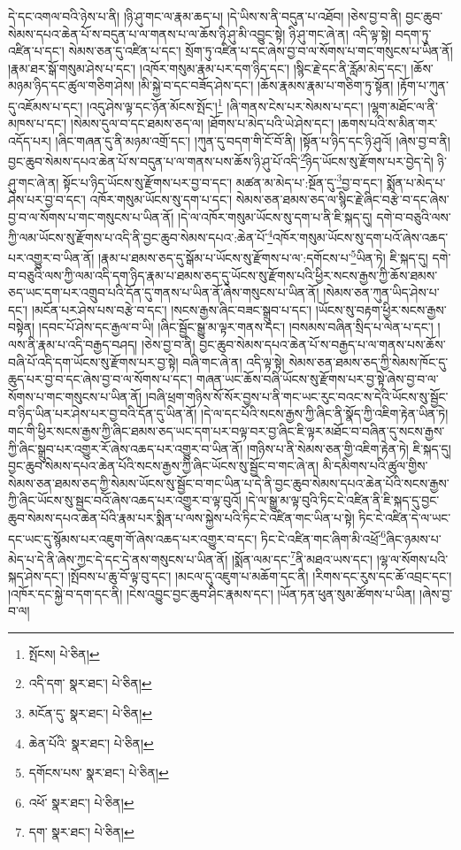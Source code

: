 དེ་དང་འགལ་བའི་ཉེས་པ་ནི། །ཉི་ཤུ་གང་ལ་རྣམ་ཆད་པ། །དེ་ཡིས་ས་ནི་བདུན་པ་འཐོབ། །ཅེས་བྱ་བ་ནི། བྱང་ཆུབ་སེམས་དཔའ་ཆེན་པོ་ས་བདུན་པ་ལ་གནས་པ་ལ་ཆོས་ཉི་ཤུ་མི་འབྱུང་སྟེ། ཉི་ཤུ་གང་ཞེ་ན། འདི་ལྟ་སྟེ། བདག་ཏུ་འཛིན་པ་དང་། སེམས་ཅན་དུ་འཛིན་པ་དང་། སྲོག་ཏུ་འཛིན་པ་དང་ཞེས་བྱ་བ་ལ་སོགས་པ་གང་གསུངས་པ་ཡིན་ནོ། །རྣམ་ཐར་སྒོ་གསུམ་ཤེས་པ་དང་། །འཁོར་གསུམ་རྣམ་པར་དག་ཉིད་དང་། །སྙིང་རྗེ་དང་ནི་རློམ་མེད་དང་། །ཆོས་མཉམ་ཉིད་དང་ཚུལ་གཅིག་ཤེས། །མི་སྐྱེ་བ་དང་བཟོད་ཤེས་དང་། །ཆོས་རྣམས་རྣམ་པ་གཅིག་ཏུ་སྟོན། །རྟོག་པ་ཀུན་དུ་འཇོམས་པ་དང་། །འདུ་ཤེས་ལྟ་དང་ཉོན་མོངས་སྤོང་།\footnote{སྤོངས།  པེ་ཅིན། } །ཞི་གནས་ངེས་པར་སེམས་པ་དང་། །ལྷག་མཐོང་ལ་ནི་མཁས་པ་དང་། །སེམས་དུལ་བ་དང་ཐམས་ཅད་ལ། །ཐོགས་པ་མེད་པའི་ཡེ་ཤེས་དང་། །ཆགས་པའི་ས་མིན་གར་འདོད་པར། །ཞིང་གཞན་དུ་ནི་མཉམ་འགྲོ་དང་། །ཀུན་དུ་བདག་གི་ངོ་བོ་ནི། །སྟོན་པ་ཉིད་དང་ཉི་ཤུའོ། །ཞེས་བྱ་བ་ནི། བྱང་ཆུབ་སེམས་དཔའ་ཆེན་པོ་ས་བདུན་པ་ལ་གནས་པས་ཆོས་ཉི་ཤུ་པོ་འདི་\footnote{འདི་དག་  སྣར་ཐང་།  པེ་ཅིན། }ཉིད་ཡོངས་སུ་རྫོགས་པར་བྱེད་དེ། ཉི་ཤུ་གང་ཞེ་ན། སྟོང་པ་ཉིད་ཡོངས་སུ་རྫོགས་པར་བྱ་བ་དང་། མཚན་མ་མེད་པ་:སྔོན་དུ་\footnote{མངོན་དུ་  སྣར་ཐང་།  པེ་ཅིན། }བྱ་བ་དང་། སྨོན་པ་མེད་པ་ཤེས་པར་བྱ་བ་དང་། འཁོར་གསུམ་ཡོངས་སུ་དག་པ་དང་། སེམས་ཅན་ཐམས་ཅད་ལ་སྙིང་རྗེ་ཞིང་བརྩེ་བ་དང་ཞེས་བྱ་བ་ལ་སོགས་པ་གང་གསུངས་པ་ཡིན་ནོ། །དེ་ལ་འཁོར་གསུམ་ཡོངས་སུ་དག་པ་ནི་ཇི་སྐད་དུ། དགེ་བ་བཅུའི་ལས་ཀྱི་ལམ་ཡོངས་སུ་རྫོགས་པ་འདི་ནི་བྱང་ཆུབ་སེམས་དཔའ་:ཆེན་པོ་\footnote{ཆེན་པོའི་  སྣར་ཐང་།  པེ་ཅིན། }འཁོར་གསུམ་ཡོངས་སུ་དག་པའོ་ཞེས་འཆད་པར་འགྱུར་བ་ཡིན་ནོ། །རྣམ་པ་ཐམས་ཅད་དུ་སྒོམ་པ་ཡོངས་སུ་རྫོགས་པ་ལ་:དགོངས་པ་\footnote{དགོངས་པས་  སྣར་ཐང་།  པེ་ཅིན། }ཡིན་ཏེ། ཇི་སྐད་དུ། དགེ་བ་བཅུའི་ལས་ཀྱི་ལམ་འདི་དག་ཉིད་རྣམ་པ་ཐམས་ཅད་དུ་ཡོངས་སུ་རྫོགས་པའི་ཕྱིར་སངས་རྒྱས་ཀྱི་ཆོས་ཐམས་ཅད་ཡང་དག་པར་འགྲུབ་པའི་དོན་དུ་གནས་པ་ཡིན་ནོ་ཞེས་གསུངས་པ་ཡིན་ནོ། །སེམས་ཅན་ཀུན་ཡིད་ཤེས་པ་དང་། །མངོན་པར་ཤེས་པས་བརྩེ་བ་དང་། །སངས་རྒྱས་ཞིང་བཟང་སྒྲུབ་པ་དང་། །ཡོངས་སུ་བརྟག་ཕྱིར་སངས་རྒྱས་བསྟེན། །དབང་པོ་ཤེས་དང་རྒྱལ་བ་ཡི། །ཞིང་སྦྱོང་སྒྱུ་མ་ལྟར་གནས་དང་། །བསམས་བཞིན་སྲིད་པ་ལེན་པ་དང་། །ལས་ནི་རྣམ་པ་འདི་བརྒྱད་བཤད། །ཅེས་བྱ་བ་ནི། བྱང་ཆུབ་སེམས་དཔའ་ཆེན་པོ་ས་བརྒྱད་པ་ལ་གནས་པས་ཆོས་བཞི་པོ་འདི་དག་ཡོངས་སུ་རྫོགས་པར་བྱ་སྟེ། བཞི་གང་ཞེ་ན། འདི་ལྟ་སྟེ། སེམས་ཅན་ཐམས་ཅད་ཀྱི་སེམས་ཁོང་དུ་ཆུད་པར་བྱ་བ་དང་ཞེས་བྱ་བ་ལ་སོགས་པ་དང་། གཞན་ཡང་ཆོས་བཞི་ཡོངས་སུ་རྫོགས་པར་བྱ་སྟེ་ཞེས་བྱ་བ་ལ་སོགས་པ་གང་གསུངས་པ་ཡིན་ནོ། །བཞི་ཕྲག་གཉིས་སོ་སོར་བྱས་པ་ནི་གང་ཡང་རུང་བའང་ས་དེའི་ཡོངས་སུ་སྦྱོང་བ་ཉིད་ཡིན་པར་ཤེས་པར་བྱ་བའི་དོན་དུ་ཡིན་ནོ། །དེ་ལ་དང་པོའི་སངས་རྒྱས་ཀྱི་ཞིང་ནི་སྣོད་ཀྱི་འཇིག་རྟེན་ཡིན་ཏེ། གང་གི་ཕྱིར་སངས་རྒྱས་ཀྱི་ཞིང་ཐམས་ཅད་ཡང་དག་པར་བལྟ་བར་བྱ་ཞིང་ཇི་ལྟར་མཐོང་བ་བཞིན་དུ་སངས་རྒྱས་ཀྱི་ཞིང་སྒྲུབ་པར་འགྱུར་རོ་ཞེས་འཆད་པར་འགྱུར་བ་ཡིན་ནོ། །གཉིས་པ་ནི་སེམས་ཅན་གྱི་འཇིག་རྟེན་ཏེ། ཇི་སྐད་དུ། བྱང་ཆུབ་སེམས་དཔའ་ཆེན་པོའི་སངས་རྒྱས་ཀྱི་ཞིང་ཡོངས་སུ་སྦྱོང་བ་གང་ཞེ་ན། མི་དམིགས་པའི་ཚུལ་གྱིས་སེམས་ཅན་ཐམས་ཅད་ཀྱི་སེམས་ཡོངས་སུ་སྦྱོང་བ་གང་ཡིན་པ་དེ་ནི་བྱང་ཆུབ་སེམས་དཔའ་ཆེན་པོའི་སངས་རྒྱས་ཀྱི་ཞིང་ཡོངས་སུ་སྦྱང་བའོ་ཞེས་འཆད་པར་འགྱུར་བ་ལྟ་བུའོ། །དེ་ལ་སྒྱུ་མ་ལྟ་བུའི་ཏིང་ངེ་འཛིན་ནི་ཇི་སྐད་དུ་བྱང་ཆུབ་སེམས་དཔའ་ཆེན་པོའི་རྣམ་པར་སྨིན་པ་ལས་སྐྱེས་པའི་ཏིང་ངེ་འཛིན་གང་ཡིན་པ་སྟེ། ཏིང་ངེ་འཛིན་དེ་ལ་ཡང་དང་ཡང་དུ་སྙོམས་པར་འཇུག་གོ་ཞེས་འཆད་པར་འགྱུར་བ་དང་། ཏིང་ངེ་འཛིན་གང་ཞིག་མི་འཕྲོ་\footnote{འཕོ་  སྣར་ཐང་།  པེ་ཅིན། }ཞིང་ཉམས་པ་མེད་པ་དེ་ནི་ཞེས་ཀྱང་དེ་དང་དེ་ནས་གསུངས་པ་ཡིན་ནོ། །སྨོན་ལམ་དང་\footnote{དག་  སྣར་ཐང་།  པེ་ཅིན། }ནི་མཐའ་ཡས་དང་། །ལྷ་ལ་སོགས་པའི་སྐད་ཤེས་དང་། །སྤོབས་པ་ཆུ་བོ་ལྟ་བུ་དང་། །མངལ་དུ་འཇུག་པ་མཆོག་དང་ནི། །རིགས་དང་རུས་དང་ཆོ་འབྲང་དང་། །འཁོར་དང་སྐྱེ་བ་དག་དང་ནི། །ངེས་འབྱུང་བྱང་ཆུབ་ཤིང་རྣམས་དང་། །ཡོན་ཏན་ཕུན་སུམ་ཚོགས་པ་ཡིན། །ཞེས་བྱ་བ་ལ། 